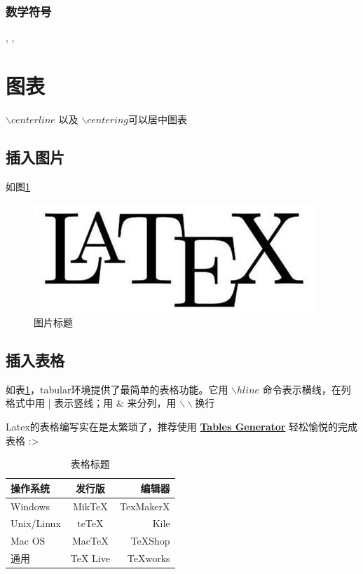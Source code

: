 \subsubsection{数学符号}

\checkmark, \cmark ,\xmark

\section{图表}
$\backslash centerline{}$ 以及 $\backslash centering$可以居中图表

\subsection{插入图片}
如图\ref{fig:myfig1}
\begin{figure}[htbp]
\centering
\includegraphics[width = .8\textwidth]{figure/Latex.jpg}
\caption{图片标题}
\label{fig:myfig1}
\end{figure}

\subsection{插入表格}
如表\ref{tab:mytab2}，tabular环境提供了最简单的表格功能。它用 $\backslash hline$ 命令表示横线，在列格式中用 | 表示竖线；用 $\&$ 来分列，用 $\backslash\backslash$换行 

Latex的表格编写实在是太繁琐了，推荐使用 \textbf{\href{http://www.tablesgenerator.com/}{Tables Generator}} 轻松愉悦的完成表格 :>

\begin{table}[htbp]
    \centering
    \begin{tabular}{|l|c|r|}
         \hline
        操作系统& 发行版& 编辑器\\
         \hline
        Windows & MikTeX & TexMakerX \\
         \hline
        Unix/Linux & teTeX & Kile \\
         \hline
        Mac OS & MacTeX & TeXShop \\
         \hline
        通用& TeX Live & TeXworks \\
         \hline
    \end{tabular}
    \caption{表格标题}
    \label{tab:mytab2}
\end{table}


